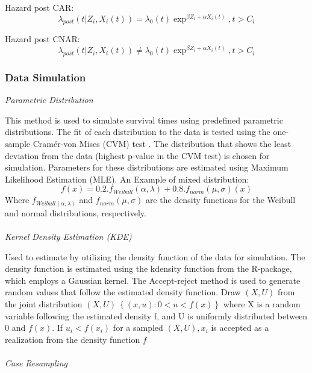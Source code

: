 Hazard post CAR: 
\begin{equation} \label{eq:carassmp}\lambda_{post}(t|Z_{i},X_{i}(t)) = \lambda_{0}(t)\exp^{\beta Z_{i} + \alpha X_{i}(t)}, t>C_{i}\end{equation}

Hazard post CNAR:
\begin{equation} \label{eq:cnarassmp}\lambda_{post}(t|Z_{i},X_{i}(t)) \neq \lambda_{0}(t)\exp^{\beta Z_{i} + \alpha X_{i}(t)}, t>C_{i}\end{equation}

\subsubsection{Data Simulation}
\textit{Parametric Distribution}
\par \noindent This method is used to simulate survival times using predefined parametric distributions. The fit of each distribution to the data is tested using the one-sample Cramér-von Mises (CVM) test \parencite{thurow_how_2023}. The distribution that shows the least deviation from the data (highest p-value in the CVM test) is chosen for simulation. Parameters for these distributions are estimated using Maximum Likelihood Estimation (MLE). An Example of mixed distribution: 
\begin{equation} \label{eq:paramdist}f(x)=0.2.f_{Weibull}(\alpha,\lambda)+0.8.f_{norm}(\mu,\sigma)(x)\end{equation}
\noindent Where \(f_{Weibull(\alpha, \lambda)}\) and \(f_{norm}(\mu,\sigma)\) are the density functions for the Weibull and normal distributions, respectively.
\\\\
\textit{Kernel Density Estimation (KDE)}
\par \noindent Used to estimate by utilizing the density function of the data for simulation. The density function is estimated using the kdensity function from the \parencite{thurow_how_2023} R-package, which employs a Gaussian kernel. The Accept-reject method is used to generate random values that follow the estimated density function. Draw \((X, U)\) from the joint distribution \((X, U) ~ \left\{ (x,u):0<u<f(x)\right\}\) where X is a random variable following the estimated density f, and U is uniformly distributed between 0 and \(f(x)\). If \(u_{i} < f(x_{i})\) for a sampled \((X,U),x_{i}\) is accepted as a realization from the density function \(f\)
\\\\
\textit{Case Resampling}

